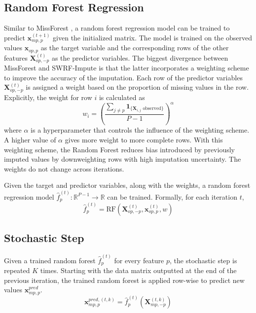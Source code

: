 \documentclass[preprint]{aastex631}
\begin{document}
\subsection{Random Forest Regression}
Similar to MissForest \citep{stekhovenMissForestnonparametricMissingValue2012}, a random forest regression model can be trained to predict $\mathbf{x}^{(t+1)}_{mp,p}$ given the initialized matrix. The model is trained on the observed values $\mathbf{x}_{op,p}$ as the target variable and the corresponding rows of the other features $\mathbf{X}^{(t)}_{op,-p}$ as the predictor variables. The biggest divergence between MissForest and SWRF-Impute is that the latter incorporates a weighting scheme to improve the accuracy of the imputation. Each row of the predictor variables $\mathbf{X}^{(t)}_{op,-p}$ is assigned a weight based on the proportion of missing values in the row. Explicitly, the weight for row $i$ is calculated as
\begin{equation}
  w_i = \left(\frac{\sum_{j \neq p} \mathbf{1}_{\{\mathbf{X}_{i,j} \text{ observed}\}}}{P-1}\right)^\alpha
\end{equation}
where $\alpha$ is a hyperparameter that controls the influence of the weighting scheme. A higher value of $\alpha$ gives more weight to more complete rows. With this weighting scheme, the Random Forest reduces bias introduced by previously imputed values by downweighting rows with high imputation uncertainty. The weights do not change across iterations.

Given the target and predictor variables, along with the weights, a random forest regression model $\hat{f}^{(t)}_p : \mathbb{R}^{P-1} \rightarrow \mathbb{R}$ can be trained. Formally, for each iteration $t$,
\begin{equation}
  \hat{f}^{(t)}_p = \text{RF}\left(\mathbf{X}^{(t)}_{op,-p}, \mathbf{x}^{(t)}_{op,p},w\right)
\end{equation}

\subsection{Stochastic Step}
Given a trained random forest $\hat{f}^{(t)}_p$ for every feature $p$, the stochastic step is repeated $K$ times. Starting with the data matrix outputted at the end of the previous iteration, the trained random forest is applied row-wise to predict new values $\mathbf{x}^{pred}_{mp,p}$.
\begin{equation}
  \mathbf{x}^{pred,(t,k)}_{mp,p} = \hat{f}^{(t)}_p(\mathbf{X}^{(t,k)}_{mp,-p})
\end{equation}
\end{document}
